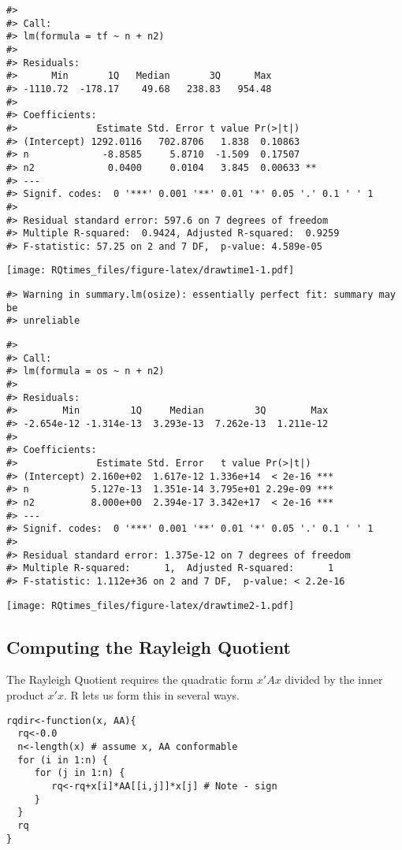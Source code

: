 \begin{verbatim}
#> 
#> Call:
#> lm(formula = tf ~ n + n2)
#> 
#> Residuals:
#>      Min       1Q   Median       3Q      Max 
#> -1110.72  -178.17    49.68   238.83   954.48 
#> 
#> Coefficients:
#>              Estimate Std. Error t value Pr(>|t|)   
#> (Intercept) 1292.0116   702.8706   1.838  0.10863   
#> n             -8.8585     5.8710  -1.509  0.17507   
#> n2             0.0400     0.0104   3.845  0.00633 **
#> ---
#> Signif. codes:  0 '***' 0.001 '**' 0.01 '*' 0.05 '.' 0.1 ' ' 1
#> 
#> Residual standard error: 597.6 on 7 degrees of freedom
#> Multiple R-squared:  0.9424, Adjusted R-squared:  0.9259 
#> F-statistic: 57.25 on 2 and 7 DF,  p-value: 4.589e-05
\end{verbatim}

\texttt{[image: RQtimes\_files/figure-latex/drawtime1-1.pdf]}

\begin{verbatim}
#> Warning in summary.lm(osize): essentially perfect fit: summary may be
#> unreliable
\end{verbatim}

\begin{verbatim}
#> 
#> Call:
#> lm(formula = os ~ n + n2)
#> 
#> Residuals:
#>        Min         1Q     Median         3Q        Max 
#> -2.654e-12 -1.314e-13  3.293e-13  7.262e-13  1.211e-12 
#> 
#> Coefficients:
#>              Estimate Std. Error   t value Pr(>|t|)    
#> (Intercept) 2.160e+02  1.617e-12 1.336e+14  < 2e-16 ***
#> n           5.127e-13  1.351e-14 3.795e+01 2.29e-09 ***
#> n2          8.000e+00  2.394e-17 3.342e+17  < 2e-16 ***
#> ---
#> Signif. codes:  0 '***' 0.001 '**' 0.01 '*' 0.05 '.' 0.1 ' ' 1
#> 
#> Residual standard error: 1.375e-12 on 7 degrees of freedom
#> Multiple R-squared:      1,  Adjusted R-squared:      1 
#> F-statistic: 1.112e+36 on 2 and 7 DF,  p-value: < 2.2e-16
\end{verbatim}

\texttt{[image: RQtimes\_files/figure-latex/drawtime2-1.pdf]}

\subsection{Computing the Rayleigh Quotient}\label{computing-the-rayleigh-quotient}

The Rayleigh Quotient requires the quadratic form \(x' A x\) divided
by the inner product \(x' x\). R lets us form this in several ways.

\begin{verbatim}
rqdir<-function(x, AA){
  rq<-0.0
  n<-length(x) # assume x, AA conformable
  for (i in 1:n) {
     for (j in 1:n) {
        rq<-rq+x[i]*AA[[i,j]]*x[j] # Note - sign
     }
  }
  rq
}
\end{verbatim}

